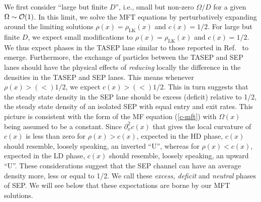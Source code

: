 \documentclass[aps,pre,twocolumn,superscriptaddress,amsmath,amssymb,longbibliography,floatfix,nofootinbib]{revtex4}
\begin{document}
{We first consider ``large but finite $D$'', i.e., small but non-zero $\Omega/D$ for a given $\Omega\sim {\cal O}(1)$. In this limit, we solve the MFT equations by perturbatively expanding around the limiting solutions $\rho(x)=\rho_\text{LK}(x)$ and $c(x)=1/2$. For large but finite $D$, we expect small modifications to $\rho(x)=\rho_\text{LK}(x)$ and $c(x)=1/2$. We thus expect phases in the TASEP lane similar to those reported in Ref.~\cite{frey-lktasep} to emerge.  Furthermore, the exchange of particles between the TASEP and SEP lanes should have the physical effects of {\em reducing} locally the difference in the densities in the TASEP and SEP lanes. This means  whenever $\rho(x)>(<) 1/2$, we expect $c(x)>(<)1/2$. This in turn suggests that the steady state density in the SEP lane should be excess (deficit) relative to 1/2, the steady state density of an isolated SEP with equal entry and exit rates. This picture is consistent with the form of the MF equation (\ref{c-mft}) with $\Omega(x)$ being assumed to be a constant. Since $\partial_x^2 c(x)$ that gives the local curvature of $c(x)$ is less than zero for $\rho(x)>c(x)$, expected in the HD phase, $c(x)$ should resemble, loosely speaking, an inverted ``U'', whereas for $\rho(x)<c(x)$, expected in the LD phase,   $c(x)$ should resemble, loosely speaking, an upward ``U''. These considerations suggest that the SEP channel can have an average density more, less or equal to 1/2. We call these {\em excess, deficit} and {\em neutral} phases of SEP. We will see below that these expectations are borne by our MFT solutions.


}
\end{document}
